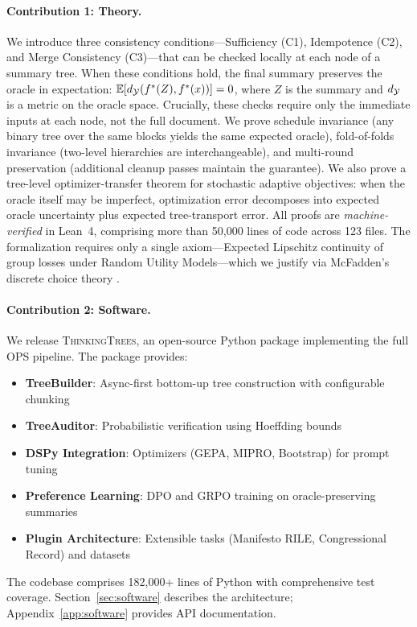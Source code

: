 \paragraph{Contribution 1: Theory.} We introduce three consistency conditions---Sufficiency (C1), Idempotence (C2), and Merge Consistency (C3)---that can be checked locally at each node of a summary tree. When these conditions hold, the final summary preserves the oracle in expectation: $\mathbb{E}[d_{\mathcal{Y}}(f^{\ast}(Z), f^{\ast}(x))] = 0$, where $Z$ is the summary and $d_{\mathcal{Y}}$ is a metric on the oracle space. Crucially, these checks require only the immediate inputs at each node, not the full document. We prove schedule invariance (any binary tree over the same blocks yields the same expected oracle), fold-of-folds invariance (two-level hierarchies are interchangeable), and multi-round preservation (additional cleanup passes maintain the guarantee). We also prove a tree-level optimizer-transfer theorem for stochastic adaptive objectives: when the oracle itself may be imperfect, optimization error decomposes into expected oracle uncertainty plus expected tree-transport error. All proofs are \emph{machine-verified} in Lean~4, comprising more than 50,000 lines of code across 123 files. The formalization requires only a single axiom---Expected Lipschitz continuity of group losses under Random Utility Models---which we justify via McFadden's discrete choice theory \citep{McFadden1974}.

\paragraph{Contribution 2: Software.} We release \textsc{ThinkingTrees}, an open-source Python package implementing the full OPS pipeline. The package provides:
\begin{itemize}[nosep]
    \item \textbf{TreeBuilder}: Async-first bottom-up tree construction with configurable chunking
    \item \textbf{TreeAuditor}: Probabilistic verification using Hoeffding bounds
    \item \textbf{DSPy Integration}: Optimizers (GEPA, MIPRO, Bootstrap) for prompt tuning
    \item \textbf{Preference Learning}: DPO and GRPO training on oracle-preserving summaries
    \item \textbf{Plugin Architecture}: Extensible tasks (Manifesto RILE, Congressional Record) and datasets
\end{itemize}
The codebase comprises 182,000+ lines of Python with comprehensive test coverage. Section~\ref{sec:software} describes the architecture; Appendix~\ref{app:software} provides API documentation.

